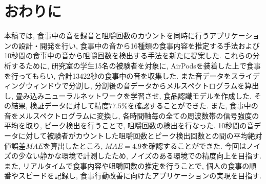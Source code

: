 
\chapter{おわりに}
\label{cha:conclu}

本稿では, 食事中の音を録音と咀嚼回数のカウントを同時に行うアプリケーションの設計・開発を行い, 食事中の音から16種類の食事内容を推定する手法および10秒間の食事中の音から咀嚼回数を検出する手法を新たに提案した. これらの分析するために, 研究室の学生15名の被験者を対象に, AirPodsを装着した上で食事を行ってもらい, 合計13422秒の食事中の音を収集した. また音データをスライディングウィンドウで分割し, 分割後の音データからメルスペクトログラムを算出し, 畳み込みニューラルネットワークを学習させ, 食品認識モデルを作成した. その結果, 検証データに対して精度$77.5\%$を確認することができた. また, 食事中の音をメルスペクトログラムに変換し, 各時間軸毎の全ての周波数帯の信号強度の平均を取り, ピーク検出を行うことで, 咀嚼回数の検出を行なった. 10秒間の音データに対して被験者がカウントした咀嚼回数とピーク検出回数との間の平均絶対値誤差$MAE$を算出したところ, $MAE = 4.9$を確認することができた. 今回はノイズの少ない静かな環境で計測したため, ノイズのある環境での精度向上を目指す. また, リアルタイムで食事内容や咀嚼回数の推定を行うことで, 個人の食事の順番やスピードを記録し, 食事行動改善に向けたアプリケーションの実現を目指す.


